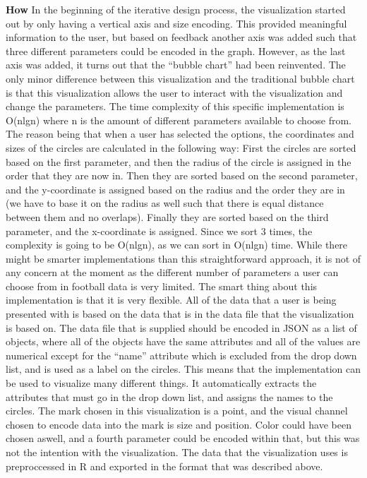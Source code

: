 \documentclass[Report.tex]{subfiles}
\begin{document}
\noindent \textbf{How} In the beginning of the iterative design process, the visualization started out by only having a vertical axis and size encoding. This provided meaningful information to the user, but based on feedback another axis was added such that three different parameters could be encoded in the graph. However, as the last axis was added, it turns out that the ``bubble chart'' had been reinvented. The only minor difference between this visualization and the traditional bubble chart is that this visualization allows the user to interact with the visualization and change the parameters. The time complexity of this specific implementation is O(nlgn) where n is the amount of different parameters available to choose from. The reason being that when a user has selected the options, the coordinates and sizes of the circles are calculated in the following way: First the circles are sorted based on the first parameter, and then the radius of the circle is assigned in the order that they are now in. Then they are sorted based on the second parameter, and the y-coordinate is assigned based on the radius and the order they are in (we have to base it on the radius as well such that there is equal distance between them and no overlaps). Finally they are sorted based on the third parameter, and the x-coordinate is assigned. Since we sort 3 times, the complexity is going to be O(nlgn), as we can sort in O(nlgn) time. While there might be smarter implementations than this straightforward approach, it is not of any concern at the moment as the different number of parameters a user can choose from in football data is very limited. The smart thing about this implementation is that it is very flexible. All of the data that a user is being presented with is based on the data that is in the data file that the visualization is based on. The data file that is supplied should be encoded in JSON as a list of objects, where all of the objects have the same attributes and all of the values are numerical except for the ``name'' attribute which is excluded from the drop down list, and is used as a label on the circles. This means that the implementation can be used to visualize many different things. It automatically extracts the attributes that must go in the drop down list, and assigns the names to the circles. The mark chosen in this visualization is a point, and the visual channel chosen to encode data into the mark is size and position. Color could have been chosen aswell, and a fourth parameter could be encoded within that, but this was not the intention with the visualization. The data that the visualization uses is preproccessed in R and exported in the format that was described above.
\end{document}
